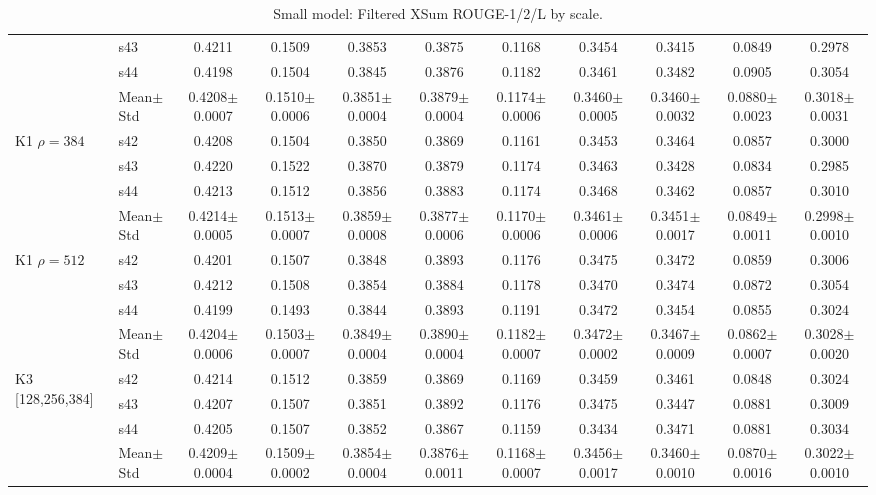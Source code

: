 \begin{table}[t]
\begin{tabular}{llccccccccc}
 & s43 & 0.4211 & 0.1509 & 0.3853 & 0.3875 & 0.1168 & 0.3454 & 0.3415 & 0.0849 & 0.2978 \\
 & s44 & 0.4198 & 0.1504 & 0.3845 & 0.3876 & 0.1182 & 0.3461 & 0.3482 & 0.0905 & 0.3054 \\
 & Mean$\pm$Std & 0.4208$\pm$0.0007 & 0.1510$\pm$0.0006 & 0.3851$\pm$0.0004 & 0.3879$\pm$0.0004 & 0.1174$\pm$0.0006 & 0.3460$\pm$0.0005 & 0.3460$\pm$0.0032 & 0.0880$\pm$0.0023 & 0.3018$\pm$0.0031 \\
\midrule
\multirow{4}{*}{K1 $\rho{=}384$} & s42 & 0.4208 & 0.1504 & 0.3850 & 0.3869 & 0.1161 & 0.3453 & 0.3464 & 0.0857 & 0.3000 \\
 & s43 & 0.4220 & 0.1522 & 0.3870 & 0.3879 & 0.1174 & 0.3463 & 0.3428 & 0.0834 & 0.2985 \\
 & s44 & 0.4213 & 0.1512 & 0.3856 & 0.3883 & 0.1174 & 0.3468 & 0.3462 & 0.0857 & 0.3010 \\
 & Mean$\pm$Std & 0.4214$\pm$0.0005 & 0.1513$\pm$0.0007 & 0.3859$\pm$0.0008 & 0.3877$\pm$0.0006 & 0.1170$\pm$0.0006 & 0.3461$\pm$0.0006 & 0.3451$\pm$0.0017 & 0.0849$\pm$0.0011 & 0.2998$\pm$0.0010 \\
\midrule
\multirow{4}{*}{K1 $\rho{=}512$} & s42 & 0.4201 & 0.1507 & 0.3848 & 0.3893 & 0.1176 & 0.3475 & 0.3472 & 0.0859 & 0.3006 \\
 & s43 & 0.4212 & 0.1508 & 0.3854 & 0.3884 & 0.1178 & 0.3470 & 0.3474 & 0.0872 & 0.3054 \\
 & s44 & 0.4199 & 0.1493 & 0.3844 & 0.3893 & 0.1191 & 0.3472 & 0.3454 & 0.0855 & 0.3024 \\
 & Mean$\pm$Std & 0.4204$\pm$0.0006 & 0.1503$\pm$0.0007 & 0.3849$\pm$0.0004 & 0.3890$\pm$0.0004 & 0.1182$\pm$0.0007 & 0.3472$\pm$0.0002 & 0.3467$\pm$0.0009 & 0.0862$\pm$0.0007 & 0.3028$\pm$0.0020 \\
\midrule
\multirow{4}{*}{K3 [128,256,384]} & s42 & 0.4214 & 0.1512 & 0.3859 & 0.3869 & 0.1169 & 0.3459 & 0.3461 & 0.0848 & 0.3024 \\
 & s43 & 0.4207 & 0.1507 & 0.3851 & 0.3892 & 0.1176 & 0.3475 & 0.3447 & 0.0881 & 0.3009 \\
 & s44 & 0.4205 & 0.1507 & 0.3852 & 0.3867 & 0.1159 & 0.3434 & 0.3471 & 0.0881 & 0.3034 \\
 & Mean$\pm$Std & 0.4209$\pm$0.0004 & 0.1509$\pm$0.0002 & 0.3854$\pm$0.0004 & 0.3876$\pm$0.0011 & 0.1168$\pm$0.0007 & 0.3456$\pm$0.0017 & 0.3460$\pm$0.0010 & 0.0870$\pm$0.0016 & 0.3022$\pm$0.0010 \\
\bottomrule
\end{tabular}
\caption{Small model: Filtered XSum ROUGE-1/2/L by scale.}
\label{tab:appendix_small_xsum}
\end{table}

